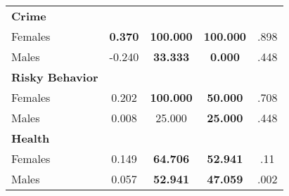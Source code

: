 \begin{tabular}{l c c c c}
\midrule
\textbf{Crime} & & & & \\
\quad Females &  \textbf{    0.370} & \textbf{  100.000} & \textbf{  100.000} & .898 \\
\quad Males &     -0.240 & \textbf{   33.333} & \textbf{    0.000} & .448 \\
\midrule
\textbf{Risky Behavior} & & & & \\
\quad Females &      0.202 & \textbf{  100.000} & \textbf{   50.000} & .708 \\
\quad Males &      0.008 &    25.000 & \textbf{   25.000} & .448 \\
\midrule
\textbf{Health} & & & & \\
\quad Females &      0.149 & \textbf{   64.706} & \textbf{   52.941} & .11 \\
\quad Males &      0.057 & \textbf{   52.941} & \textbf{   47.059} & .002 \\
\bottomrule
\end{tabular}
